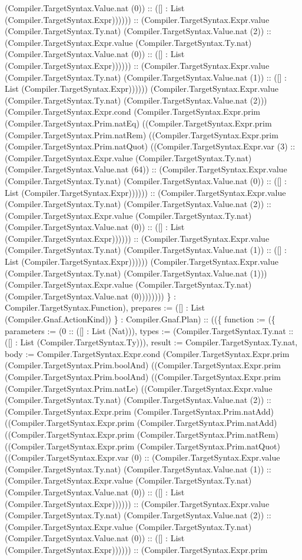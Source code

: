 \documentclass[11pt]{article}
\begin{document}
(Compiler.TargetSyntax.Value.nat (0)) :: ([] : List (Compiler.TargetSyntax.Expr)))))) :: (Compiler.TargetSyntax.Expr.value (Compiler.TargetSyntax.Ty.nat) (Compiler.TargetSyntax.Value.nat (2)) :: (Compiler.TargetSyntax.Expr.value (Compiler.TargetSyntax.Ty.nat) (Compiler.TargetSyntax.Value.nat (0)) :: ([] : List (Compiler.TargetSyntax.Expr)))))) :: (Compiler.TargetSyntax.Expr.value (Compiler.TargetSyntax.Ty.nat) (Compiler.TargetSyntax.Value.nat (1)) :: ([] : List (Compiler.TargetSyntax.Expr)))))) (Compiler.TargetSyntax.Expr.value (Compiler.TargetSyntax.Ty.nat) (Compiler.TargetSyntax.Value.nat (2))) (Compiler.TargetSyntax.Expr.cond (Compiler.TargetSyntax.Expr.prim (Compiler.TargetSyntax.Prim.natEq) ((Compiler.TargetSyntax.Expr.prim (Compiler.TargetSyntax.Prim.natRem) ((Compiler.TargetSyntax.Expr.prim (Compiler.TargetSyntax.Prim.natQuot) ((Compiler.TargetSyntax.Expr.var (3) :: (Compiler.TargetSyntax.Expr.value (Compiler.TargetSyntax.Ty.nat) (Compiler.TargetSyntax.Value.nat (64)) :: (Compiler.TargetSyntax.Expr.value (Compiler.TargetSyntax.Ty.nat) (Compiler.TargetSyntax.Value.nat (0)) :: ([] : List (Compiler.TargetSyntax.Expr)))))) :: (Compiler.TargetSyntax.Expr.value (Compiler.TargetSyntax.Ty.nat) (Compiler.TargetSyntax.Value.nat (2)) :: (Compiler.TargetSyntax.Expr.value (Compiler.TargetSyntax.Ty.nat) (Compiler.TargetSyntax.Value.nat (0)) :: ([] : List (Compiler.TargetSyntax.Expr)))))) :: (Compiler.TargetSyntax.Expr.value (Compiler.TargetSyntax.Ty.nat) (Compiler.TargetSyntax.Value.nat (1)) :: ([] : List (Compiler.TargetSyntax.Expr)))))) (Compiler.TargetSyntax.Expr.value (Compiler.TargetSyntax.Ty.nat) (Compiler.TargetSyntax.Value.nat (1))) (Compiler.TargetSyntax.Expr.value (Compiler.TargetSyntax.Ty.nat) (Compiler.TargetSyntax.Value.nat (0)))))))) \} : Compiler.TargetSyntax.Function), prepares := ([] : List (Compiler.Gnaf.ActionKind)) \} : Compiler.Gnaf.Plan) :: ((\{ function := (\{ parameters := (0 :: ([] : List (Nat))), types := (Compiler.TargetSyntax.Ty.nat :: ([] : List (Compiler.TargetSyntax.Ty))), result := Compiler.TargetSyntax.Ty.nat, body := Compiler.TargetSyntax.Expr.cond (Compiler.TargetSyntax.Expr.prim (Compiler.TargetSyntax.Prim.boolAnd) ((Compiler.TargetSyntax.Expr.prim (Compiler.TargetSyntax.Prim.boolAnd) ((Compiler.TargetSyntax.Expr.prim (Compiler.TargetSyntax.Prim.natLe) ((Compiler.TargetSyntax.Expr.value (Compiler.TargetSyntax.Ty.nat) (Compiler.TargetSyntax.Value.nat (2)) :: (Compiler.TargetSyntax.Expr.prim (Compiler.TargetSyntax.Prim.natAdd) ((Compiler.TargetSyntax.Expr.prim (Compiler.TargetSyntax.Prim.natAdd) ((Compiler.TargetSyntax.Expr.prim (Compiler.TargetSyntax.Prim.natRem) ((Compiler.TargetSyntax.Expr.prim (Compiler.TargetSyntax.Prim.natQuot) ((Compiler.TargetSyntax.Expr.var (0) :: (Compiler.TargetSyntax.Expr.value (Compiler.TargetSyntax.Ty.nat) (Compiler.TargetSyntax.Value.nat (1)) :: (Compiler.TargetSyntax.Expr.value (Compiler.TargetSyntax.Ty.nat) (Compiler.TargetSyntax.Value.nat (0)) :: ([] : List (Compiler.TargetSyntax.Expr)))))) :: (Compiler.TargetSyntax.Expr.value (Compiler.TargetSyntax.Ty.nat) (Compiler.TargetSyntax.Value.nat (2)) :: (Compiler.TargetSyntax.Expr.value (Compiler.TargetSyntax.Ty.nat) (Compiler.TargetSyntax.Value.nat (0)) :: ([] : List (Compiler.TargetSyntax.Expr)))))) :: (Compiler.TargetSyntax.Expr.prim 
\end{document}
